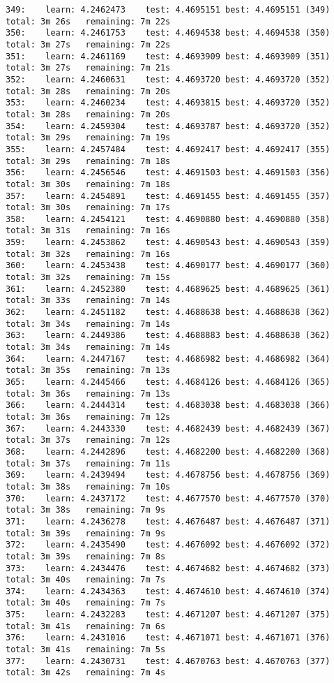 \documentclass[11pt]{article}
\begin{document}
\begin{Verbatim}[commandchars=\\\{\}]
349:	learn: 4.2462473	test: 4.4695151	best: 4.4695151 (349)	total: 3m 26s	remaining: 7m 22s
350:	learn: 4.2461753	test: 4.4694538	best: 4.4694538 (350)	total: 3m 27s	remaining: 7m 22s
351:	learn: 4.2461169	test: 4.4693909	best: 4.4693909 (351)	total: 3m 27s	remaining: 7m 21s
352:	learn: 4.2460631	test: 4.4693720	best: 4.4693720 (352)	total: 3m 28s	remaining: 7m 20s
353:	learn: 4.2460234	test: 4.4693815	best: 4.4693720 (352)	total: 3m 28s	remaining: 7m 20s
354:	learn: 4.2459304	test: 4.4693787	best: 4.4693720 (352)	total: 3m 29s	remaining: 7m 19s
355:	learn: 4.2457484	test: 4.4692417	best: 4.4692417 (355)	total: 3m 29s	remaining: 7m 18s
356:	learn: 4.2456546	test: 4.4691503	best: 4.4691503 (356)	total: 3m 30s	remaining: 7m 18s
357:	learn: 4.2454891	test: 4.4691455	best: 4.4691455 (357)	total: 3m 30s	remaining: 7m 17s
358:	learn: 4.2454121	test: 4.4690880	best: 4.4690880 (358)	total: 3m 31s	remaining: 7m 16s
359:	learn: 4.2453862	test: 4.4690543	best: 4.4690543 (359)	total: 3m 32s	remaining: 7m 16s
360:	learn: 4.2453438	test: 4.4690177	best: 4.4690177 (360)	total: 3m 32s	remaining: 7m 15s
361:	learn: 4.2452380	test: 4.4689625	best: 4.4689625 (361)	total: 3m 33s	remaining: 7m 14s
362:	learn: 4.2451182	test: 4.4688638	best: 4.4688638 (362)	total: 3m 34s	remaining: 7m 14s
363:	learn: 4.2449386	test: 4.4688883	best: 4.4688638 (362)	total: 3m 34s	remaining: 7m 14s
364:	learn: 4.2447167	test: 4.4686982	best: 4.4686982 (364)	total: 3m 35s	remaining: 7m 13s
365:	learn: 4.2445466	test: 4.4684126	best: 4.4684126 (365)	total: 3m 36s	remaining: 7m 13s
366:	learn: 4.2444314	test: 4.4683038	best: 4.4683038 (366)	total: 3m 36s	remaining: 7m 12s
367:	learn: 4.2443330	test: 4.4682439	best: 4.4682439 (367)	total: 3m 37s	remaining: 7m 12s
368:	learn: 4.2442896	test: 4.4682200	best: 4.4682200 (368)	total: 3m 37s	remaining: 7m 11s
369:	learn: 4.2439494	test: 4.4678756	best: 4.4678756 (369)	total: 3m 38s	remaining: 7m 10s
370:	learn: 4.2437172	test: 4.4677570	best: 4.4677570 (370)	total: 3m 38s	remaining: 7m 9s
371:	learn: 4.2436278	test: 4.4676487	best: 4.4676487 (371)	total: 3m 39s	remaining: 7m 9s
372:	learn: 4.2435490	test: 4.4676092	best: 4.4676092 (372)	total: 3m 39s	remaining: 7m 8s
373:	learn: 4.2434476	test: 4.4674682	best: 4.4674682 (373)	total: 3m 40s	remaining: 7m 7s
374:	learn: 4.2434363	test: 4.4674610	best: 4.4674610 (374)	total: 3m 40s	remaining: 7m 7s
375:	learn: 4.2432283	test: 4.4671207	best: 4.4671207 (375)	total: 3m 41s	remaining: 7m 6s
376:	learn: 4.2431016	test: 4.4671071	best: 4.4671071 (376)	total: 3m 41s	remaining: 7m 5s
377:	learn: 4.2430731	test: 4.4670763	best: 4.4670763 (377)	total: 3m 42s	remaining: 7m 4s

\end{Verbatim}
\end{document}
